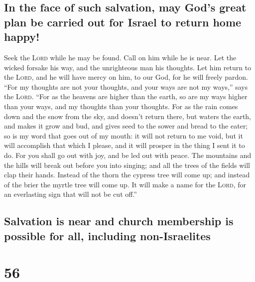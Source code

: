 \hypertarget{in-the-face-of-such-salvation-may-gods-great-plan-be-carried-out-for-israel-to-return-home-happy}{%
\subsection{In the face of such salvation, may God's great plan be
carried out for Israel to return home
happy!}\label{in-the-face-of-such-salvation-may-gods-great-plan-be-carried-out-for-israel-to-return-home-happy}}

 Seek the \textsc{Lord} while he may be found. Call on him
while he is near.  Let the wicked forsake his way, and the
unrighteous man his thoughts. Let him return to the \textsc{Lord}, and
he will have mercy on him, to our God, for he will freely pardon.
 ``For my thoughts are not your thoughts, and your ways
are not my ways,'' says the \textsc{Lord}.  ``For as the
heavens are higher than the earth, so are my ways higher than your ways,
and my thoughts than your thoughts.  For as the rain
comes down and the snow from the sky, and doesn't return there, but
waters the earth, and makes it grow and bud, and gives seed to the sower
and bread to the eater;  so is my word that goes out of
my mouth: it will not return to me void, but it will accomplish that
which I please, and it will prosper in the thing I sent it to do.
 For you shall go out with joy, and be led out with
peace. The mountains and the hills will break out before you into
singing; and all the trees of the fields will clap their hands.
 Instead of the thorn the cypress tree will come up; and
instead of the brier the myrtle tree will come up. It will make a name
for the \textsc{Lord}, for an everlasting sign that will not be cut
off.''

\hypertarget{salvation-is-near-and-church-membership-is-possible-for-all-including-non-israelites}{%
\subsection{Salvation is near and church membership is possible for all,
including
non-Israelites}\label{salvation-is-near-and-church-membership-is-possible-for-all-including-non-israelites}}

\hypertarget{section-55}{%
\section{56}\label{section-55}}

